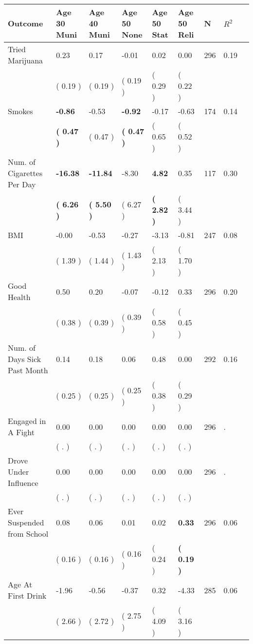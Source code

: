 \begin{tabular}{L{6.2cm} C{1.8cm} C{1.8cm} C{1.8cm} C{1.8cm} C{1.8cm} C{1.8cm} C{0.3cm} C{0.3cm}}
\toprule
 \textbf{Outcome} & \textbf{Age 30 Muni} & \textbf{Age 40 Muni} & \textbf{Age 50 None} & \textbf{Age 50 Stat} & \textbf{Age 50 Reli} & \textbf{N} & \textbf{$ R^2$} \\
\midrule
Tried Marijuana &      0.23 &      0.17 &     -0.01 &      0.02 &      0.00  & 296 &       0.19 \\ 
 & (     0.19 ) & (     0.19 ) & (     0.19 ) & (     0.29 ) & (     0.22 )  & \\
Smokes & \textbf{    -0.86} &     -0.53 & \textbf{    -0.92} &     -0.17 &     -0.63  & 174 &       0.14 \\ 
 & \textbf{(     0.47 )} & (     0.47 ) & \textbf{(     0.47 )} & (     0.65 ) & (     0.52 )  & \\
Num. of Cigarettes Per Day & \textbf{   -16.38} & \textbf{   -11.84} &     -8.30 & \textbf{     4.82} &      0.35  & 117 &       0.30 \\ 
 & \textbf{(     6.26 )} & \textbf{(     5.50 )} & (     6.27 ) & \textbf{(     2.82 )} & (     3.44 )  & \\
BMI &     -0.00 &     -0.53 &     -0.27 &     -3.13 &     -0.81  & 247 &       0.08 \\ 
 & (     1.39 ) & (     1.44 ) & (     1.43 ) & (     2.13 ) & (     1.70 )  & \\
Good Health &      0.50 &      0.20 &     -0.07 &     -0.12 &      0.33  & 296 &       0.20 \\ 
 & (     0.38 ) & (     0.39 ) & (     0.39 ) & (     0.58 ) & (     0.45 )  & \\
Num. of Days Sick Past Month &      0.14 &      0.18 &      0.06 &      0.48 &      0.00  & 292 &       0.16 \\ 
 & (     0.25 ) & (     0.25 ) & (     0.25 ) & (     0.38 ) & (     0.29 )  & \\
Engaged in A Fight &      0.00 &      0.00 &      0.00 &      0.00 &      0.00  & 296 &          . \\ 
 & (        . ) & (        . ) & (        . ) & (        . ) & (        . )  & \\
Drove Under Influence &      0.00 &      0.00 &      0.00 &      0.00 &      0.00  & 296 &          . \\ 
 & (        . ) & (        . ) & (        . ) & (        . ) & (        . )  & \\
Ever Suspended from School &      0.08 &      0.06 &      0.01 &      0.02 & \textbf{     0.33}  & 296 &       0.06 \\ 
 & (     0.16 ) & (     0.16 ) & (     0.16 ) & (     0.24 ) & \textbf{(     0.19 )}  & \\
Age At First Drink &     -1.96 &     -0.56 &     -0.37 &      0.32 &     -4.33  & 285 &       0.06 \\ 
 & (     2.66 ) & (     2.72 ) & (     2.75 ) & (     4.09 ) & (     3.16 )  & \\
\bottomrule
\end{tabular}
